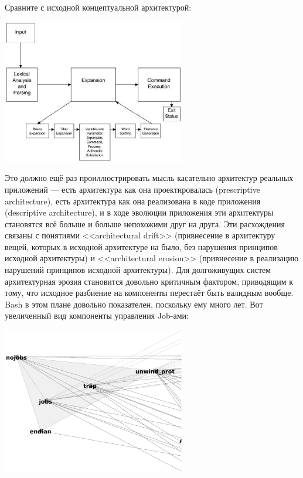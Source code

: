\documentclass[a5paper]{article}
\begin{document}
Сравните с исходной концептуальной архитектурой:

\begin{center}
    \includegraphics[width=0.6\textwidth]{bashArchitecture.png}
\end{center}

Это должно ещё раз проиллюстрировать мысль касательно архитектур реальных приложений --- есть архитектура как она проектировалась (prescriptive architecture), есть архитектура как она реализована в коде приложения (descriptive architecture), и в ходе эволюции приложения эти архитектуры становятся всё больше и больше непохожими друг на друга. Эти расхождения связаны с понятиями <<architectural drift>> (привнесение в архитектуру вещей, которых в исходной архитектуре на было, без нарушения принципов исходной архитектуры) и <<architectural erosion>> (привнесение в реализацию нарушений принципов исходной архитектуры). Для долгоживущих систем архитектурная эрозия становится довольно критичным фактором, приводящим к тому, что исходное разбиение на компоненты перестаёт быть валидным вообще. Bash в этом плане довольно показателен, поскольку ему много лет. Вот увеличенный вид компоненты управления Job-ами:

\begin{center}
    \includegraphics[width=0.6\textwidth]{bashJobControl.png}
\end{center}
\end{document}
